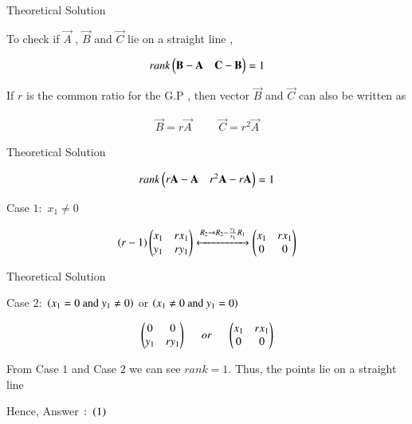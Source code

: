 \documentclass{beamer}
\begin{document}
\begin{frame}{Theoretical Solution}

To check if $\vec{A}$ , $\vec{B}$ and $\vec{C}$ lie on a straight line , 

\begin{align}
    rank\begin{pmatrix}\mathbf{B} - \mathbf{A} & \mathbf{C} - \mathbf{B}\end{pmatrix} = 1
\end{align}

If $r$ is the common ratio for the G.P , then vector $\vec{B}$ and $\vec{C}$ can also be written as

\begin{align}
    \vec{B} = r\vec{A} \hspace{1cm} \vec{C} = r^2\vec{A} 
\end{align}

\end{frame}
\begin{frame}{Theoretical Solution}

\begin{align}
    rank\begin{pmatrix}r\mathbf{A} - \mathbf{A} & r^2\mathbf{A} - r\mathbf{A} \end{pmatrix} = 1 
\end{align}

Case $1\colon$ $x_1 \neq 0 $ 

\begin{align}
    \left(r-1\right)\begin{pmatrix}x_1 & rx_1 \\ y_1 & ry_1\end{pmatrix} \xleftrightarrow[]{R_2 \rightarrow {R_2 - \frac{y_1}{x_1}R_1 }} \begin{pmatrix}x_1 & rx_1 \\ 0 & 0 \end{pmatrix}
\end{align}

\end{frame}
\begin{frame}{Theoretical Solution}

Case $2\colon$ $\left(x_1 = 0  \text{ and }  y_1 \neq 0\right)$ or $\left(x_1 \neq 0 \text{ and }  y_1 = 0 \right)$

\begin{align}
    \begin{pmatrix}0 & 0 \\ y_1 & ry_1\end{pmatrix} \hspace{0.5cm}or\hspace{0.5cm} \begin{pmatrix}x_1 & rx_1 \\ 0 & 0\end{pmatrix} 
\end{align}

From Case $1$ and Case $2$ we can see $rank = 1$. Thus, the points lie on a straight line

Hence, Answer $\colon \left(1\right)$
\end{frame}
\end{document}
